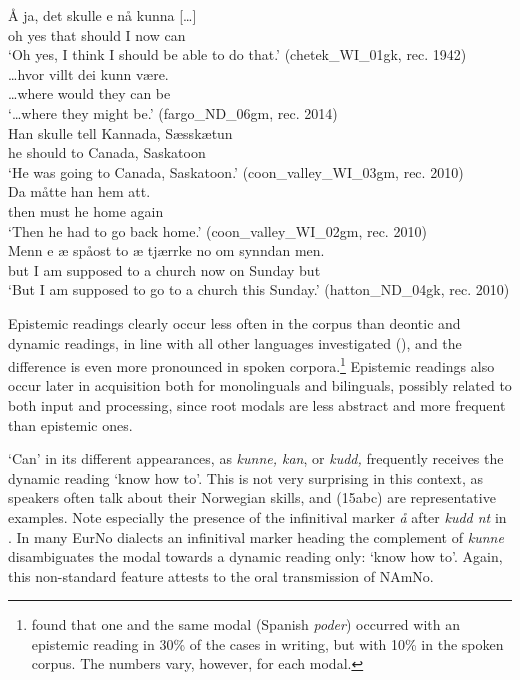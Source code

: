 \documentclass[output=paper]{langscibook}
\begin{document}
\ea%
    \label{ex:eide:14}
    \ea \label{ex:eide:14a} 
    \gll Å ja, det skulle e nå kunna […]      \\
         oh yes that should I now can      \\
    \glt ‘Oh yes, I think I should be able to do that.’ (chetek\_WI\_01gk, rec. 1942)\\
    \ex \label{ex:eide:14b} 
    \gll …hvor villt dei kunn være.      \\
         …where would they can be      \\
    \glt ‘…where they might be.’ (fargo\_ND\_06gm, rec. 2014) \\
    \ex \label{ex:eide:14c} 
    \gll Han skulle tell Kannada, Sæsskætun    \\
         he should to Canada, Saskatoon      \\
    \glt ‘He was going to Canada, Saskatoon.’ (coon\_valley\_WI\_03gm, rec. 2010)\\
    \ex \label{ex:eide:14d} 
    \gll Da måtte han hem att.        \\
         then must he home again       \\
    \glt ‘Then he had to go back home.’ (coon\_valley\_WI\_02gm, rec. 2010)\\
    \ex\label{ex:eide:14e} 
    \gll Menn e æ spåost to æ tjærrke no om synndan men.     \\
         but I am supposed to a church now on Sunday but    \\
    \glt ‘But I am supposed to go to a church this Sunday.’  (hatton\_ND\_04gk, rec. 2010)\\
    \z %
\z

Epistemic readings clearly occur less often in the corpus than deontic and dynamic readings, in line with all other languages investigated (\citealt{BiberEtAl1999, HacquardWellwood2012}), and the difference is even more pronounced in spoken corpora.\footnote{\citet[182]{Cornillie2007} found that one and the same modal (Spanish \textit{poder}) occurred with an epistemic reading in 30\% of the cases in writing, but with 10\% in the spoken corpus. The numbers vary, however, for each modal.} Epistemic readings also occur later in acquisition both for monolinguals and bilinguals, possibly related to both input and processing, since root modals are less abstract and more frequent than epistemic ones. 

‘Can’ in its different appearances, as \textit{kunne, kan}, or \textit{kudd,} frequently receives the dynamic reading ‘know how to’. This is not very surprising in this context, as speakers often talk about their Norwegian skills, and (15abc) are representative examples. Note especially the presence of the infinitival marker \textit{å} after \textit{kudd nt} in . In many EurNo dialects an infinitival marker heading the complement of \textit{kunne} disambiguates the modal towards a dynamic reading only: ‘know how to’. Again, this non-standard feature attests to the oral transmission of NAmNo.
\end{document}
